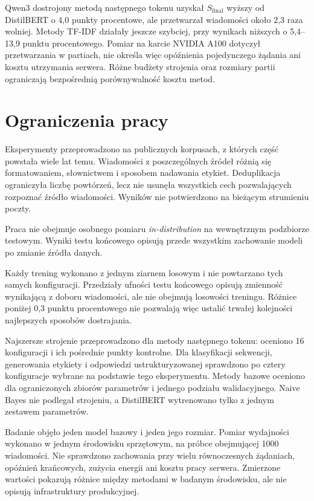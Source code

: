 \begin{enumerate}
    Qwen3 dostrojony metodą następnego tokenu uzyskał
    \(S_{\mathrm{final}}\) wyższy od DistilBERT o 4,0 punkty procentowe, ale
    przetwarzał wiadomości około 2,3 raza wolniej. Metody TF-IDF działały
    jeszcze szybciej, przy wynikach niższych o 5,4--13,9 punktu procentowego.
    Pomiar na karcie NVIDIA A100 dotyczył przetwarzania w partiach, nie określa
    więc opóźnienia pojedynczego żądania ani kosztu utrzymania serwera.
    Różne budżety strojenia oraz rozmiary partii ograniczają bezpośrednią
    porównywalność kosztu metod.
\end{enumerate}

\section{Ograniczenia pracy}

Eksperymenty przeprowadzono na publicznych korpusach, z których część powstała
wiele lat temu. Wiadomości z poszczególnych źródeł różnią się formatowaniem,
słownictwem i sposobem nadawania etykiet. Deduplikacja ograniczyła liczbę
powtórzeń, lecz nie usunęła wszystkich cech pozwalających rozpoznać źródło
wiadomości. Wyników nie potwierdzono na bieżącym strumieniu poczty.

Praca nie obejmuje osobnego pomiaru \emph{in-distribution} na wewnętrznym
podzbiorze testowym. Wyniki testu końcowego opisują przede wszystkim zachowanie
modeli po zmianie źródła danych.

Każdy trening wykonano z jednym ziarnem losowym i nie powtarzano tych samych
konfiguracji. Przedziały ufności testu końcowego opisują zmienność wynikającą z
doboru wiadomości, ale nie obejmują losowości treningu. Różnice poniżej 0,3
punktu procentowego nie pozwalają więc ustalić trwałej kolejności
najlepszych sposobów dostrajania.

Najszersze strojenie przeprowadzono dla metody następnego tokenu: oceniono 16
konfiguracji i ich pośrednie punkty kontrolne. Dla klasyfikacji sekwencji,
generowania etykiety i odpowiedzi ustrukturyzowanej sprawdzono po cztery
konfiguracje wybrane na podstawie tego eksperymentu. Metody bazowe oceniono dla ograniczonych zbiorów parametrów i
jednego podziału walidacyjnego. Naive Bayes nie podlegał strojeniu, a
DistilBERT wytrenowano tylko z jednym zestawem parametrów.

Badanie objęło jeden model bazowy i jeden jego rozmiar. Pomiar wydajności
wykonano w jednym środowisku sprzętowym, na próbce obejmującej 1000 wiadomości.
Nie sprawdzono zachowania przy wielu równoczesnych żądaniach, opóźnień
krańcowych, zużycia energii ani kosztu pracy serwera. Zmierzone wartości
pokazują różnice między metodami w badanym środowisku, ale nie opisują
infrastruktury produkcyjnej.

